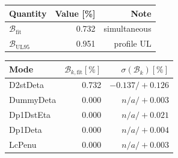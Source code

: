 \begin{tabular}{lrr}
\hline
Quantity & Value [\%] & Note \\
\hline
$\mathcal{B}_{\mathrm{fit}}$ & 0.732 & simultaneous \\
$\mathcal{B}_{\mathrm{UL95}}$ & 0.951 & profile UL \\
\hline
\end{tabular}

\vspace{0.4em}

\begin{tabular}{lrr}
\hline
Mode & $\mathcal{B}_{k,\mathrm{fit}}[\%]$ & $\sigma(\mathcal{B}_k)[\%]$ \\
\hline
D2stDeta & 0.732 & $-0.137/+0.126$ \\
DummyDeta & 0.000 & $n/a/+0.003$ \\
Dp1DstEta & 0.000 & $n/a/+0.021$ \\
Dp1Deta & 0.000 & $n/a/+0.004$ \\
LcPenu & 0.000 & $n/a/+0.003$ \\
\hline
\end{tabular}
